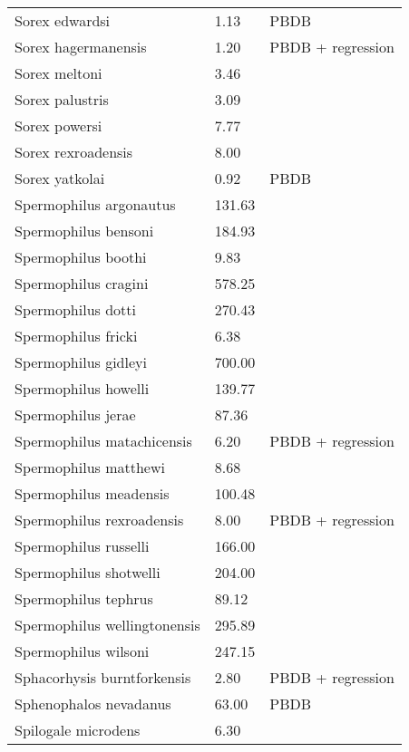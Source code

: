 \documentclass{article}
\begin{document}
\begin{center}
\begin{longtable}{p{} p{} p{}}
    Sorex edwardsi & 1.13 & PBDB \\ 
    Sorex hagermanensis & 1.20 & PBDB + regression \\ 
    Sorex meltoni & 3.46 & \cite{Tomiya2013} \\ 
    Sorex palustris & 3.09 & \cite{Smith2004} \\ 
    Sorex powersi & 7.77 & \cite{Tomiya2013} \\ 
    Sorex rexroadensis & 8.00 & \cite{McKenna2011} \\ 
    Sorex yatkolai & 0.92 & PBDB \\ 
    Spermophilus argonautus & 131.63 & \cite{Tomiya2013} \\ 
    Spermophilus bensoni & 184.93 & \cite{Tomiya2013} \\ 
    Spermophilus boothi & 9.83 & \cite{Secord2008a} \\ 
    Spermophilus cragini & 578.25 & \cite{Tomiya2013} \\ 
    Spermophilus dotti & 270.43 & \cite{Tomiya2013} \\ 
    Spermophilus fricki & 6.38 & \cite{Simons1960} \\ 
    Spermophilus gidleyi & 700.00 & \cite{McKenna2011} \\ 
    Spermophilus howelli & 139.77 & \cite{Tomiya2013} \\ 
    Spermophilus jerae & 87.36 & \cite{Tomiya2013} \\ 
    Spermophilus matachicensis & 6.20 & PBDB + regression \\ 
    Spermophilus matthewi & 8.68 & \cite{Beatty2009} \\ 
    Spermophilus meadensis & 100.48 & \cite{Tomiya2013} \\ 
    Spermophilus rexroadensis & 8.00 & PBDB + regression \\ 
    Spermophilus russelli & 166.00 & \cite{McKenna2011} \\ 
    Spermophilus shotwelli & 204.00 & \cite{McKenna2011} \\ 
    Spermophilus tephrus & 89.12 & \cite{Tomiya2013} \\ 
    Spermophilus wellingtonensis & 295.89 & \cite{Tomiya2013} \\ 
    Spermophilus wilsoni & 247.15 & \cite{Tomiya2013} \\ 
    Sphacorhysis burntforkensis & 2.80 & PBDB + regression \\ 
    Sphenophalos nevadanus & 63.00 & PBDB \\ 
    Spilogale microdens & 6.30 & \cite{Chester2012} \\ 

\end{longtable}
\end{center}
\end{document}
